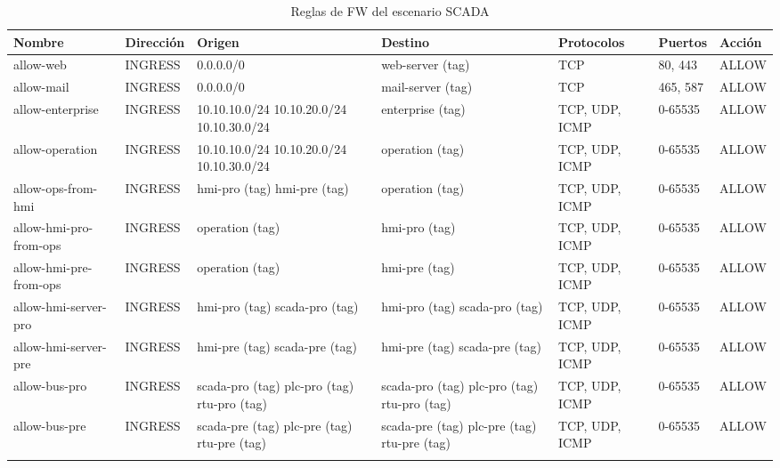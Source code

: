    \begin{table}[h]
    \begin{center}
      \footnotesize\begin{tabular}{ | m{2cm} | w{c}{1,5cm} | m{2cm} | m{2cm} | m{2cm} | w{c}{1,25cm} | w{c}{1,25cm} | }
        \hline{} \centering\textbf{Nombre} & \textbf{Dirección} & \centering\textbf{Origen} & \centering\textbf{Destino} & \centering\textbf{Protocolos} & \textbf{Puertos} & \textbf{Acción} \\ \hline
        allow-web & INGRESS & 0.0.0.0/0 & web-server (tag) & \centering TCP & 80, 443 & ALLOW  \\ \hline{}
        allow-mail & INGRESS & 0.0.0.0/0 & mail-server (tag) & \centering TCP & 465, 587 & ALLOW  \\ \hline
        allow-enterprise & INGRESS & 10.10.10.0/24 10.10.20.0/24 10.10.30.0/24 & enterprise (tag) & TCP, UDP, ICMP & 0-65535 & ALLOW \\ \hline{}
        allow-operation & INGRESS & 10.10.10.0/24 10.10.20.0/24 10.10.30.0/24 & operation (tag) & TCP, UDP, ICMP & 0-65535 & ALLOW \\ \hline
        allow-ops-from-hmi & INGRESS & hmi-pro (tag) hmi-pre (tag) & operation (tag) & TCP, UDP, ICMP & 0-65535 & ALLOW \\ \hline{}
        allow-hmi-pro-from-ops & INGRESS & operation (tag) & hmi-pro (tag) & TCP, UDP, ICMP & 0-65535 & ALLOW \\ \hline
        allow-hmi-pre-from-ops & INGRESS & operation (tag) & hmi-pre (tag) & TCP, UDP, ICMP & 0-65535 & ALLOW \\ \hline{}
        allow-hmi-server-pro & INGRESS & hmi-pro (tag) scada-pro (tag) & hmi-pro (tag) scada-pro (tag) & TCP, UDP, ICMP & 0-65535 & ALLOW \\ \hline 
        allow-hmi-server-pre & INGRESS & hmi-pre (tag) scada-pre (tag) & hmi-pre (tag) scada-pre (tag) & TCP, UDP, ICMP & 0-65535 & ALLOW \\ \hline{}
        allow-bus-pro & INGRESS & scada-pro (tag) plc-pro (tag) rtu-pro (tag) & scada-pro (tag) plc-pro (tag) rtu-pro (tag) & TCP, UDP, ICMP & 0-65535 & ALLOW \\ \hline
        allow-bus-pre & INGRESS & scada-pre (tag) plc-pre (tag) rtu-pre (tag) & scada-pre (tag) plc-pre (tag) rtu-pre (tag) & TCP, UDP, ICMP & 0-65535 & ALLOW \\ \hline{}

      \end{tabular}
      \caption{Reglas de FW del escenario SCADA}
      \label{tab:fw4}
    \end{center}
  \end{table}

